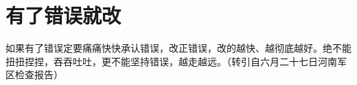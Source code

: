 \section[有了错误就改（一九六七年六月）]{有了错误就改}


如果有了错误定要痛痛快快承认错误，改正错误，改的越快、越彻底越好。绝不能扭扭捏捏，吞吞吐吐，更不能坚持错误，越走越远。（转引自六月二十七日河南军区检查报告）


